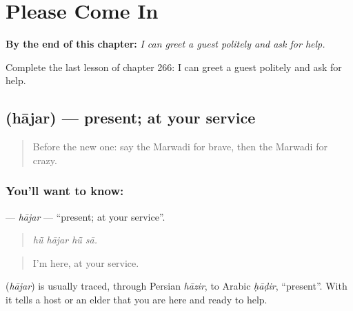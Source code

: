 
\chapter{Please Come In}
\label{ch:mw-please-come-in}

\begin{chapteropening}
\textbf{By the end of this chapter:} \emph{I can greet a guest politely and ask for help.}

Complete the last lesson of chapter 266: I can greet a guest politely and ask for help.
\end{chapteropening}

\section[\texorpdfstring{\mw{हाजर} (hājar)}{हाजर (hājar)}]{ (hājar) — present; at your service}

\label{lesson:MW-C266-hajar}



\begin{quote}
Before the new one: say the Marwadi for brave, then the Marwadi for crazy.
\end{quote}

\subsection*{You'll want to know: }
\textbf{} — \emph{hājar} — \textquotedblleft{}present; at your service\textquotedblright{}.

\begin{quote}
   
\end{quote}

\begin{quote}
\emph{hū̃ hājar hū̃ sā.}
\end{quote}

\begin{quote}
I'm here, at your service.
\end{quote}

\begin{cousinweb}
\textbf{} (\emph{hājar}) is usually traced, through Persian \emph{hāzir}, to Arabic \emph{ḥāḍir}, \textquotedblleft{}present\textquotedblright{}. With \textbf{} it tells a host or an elder that you are here and ready to help.
\end{cousinweb}


